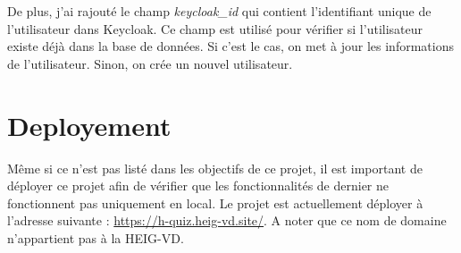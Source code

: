 De plus, j'ai rajouté le champ \emph{keycloak\_id} qui contient l'identifiant unique de l'utilisateur dans Keycloak. Ce champ est utilisé pour vérifier si l'utilisateur existe déjà dans la base de données. Si c'est le cas, on met à jour les informations de l'utilisateur. Sinon, on crée un nouvel utilisateur.

\section{Deployement}
Même si ce n'est pas listé dans les objectifs de ce projet, il est important de déployer ce projet afin de vérifier que les fonctionnalités de dernier ne fonctionnent pas uniquement en local. Le projet est actuellement déployer à l'adresse suivante : \url{https://h-quiz.heig-vd.site/}. A noter que ce nom de domaine n'appartient pas à la HEIG-VD.